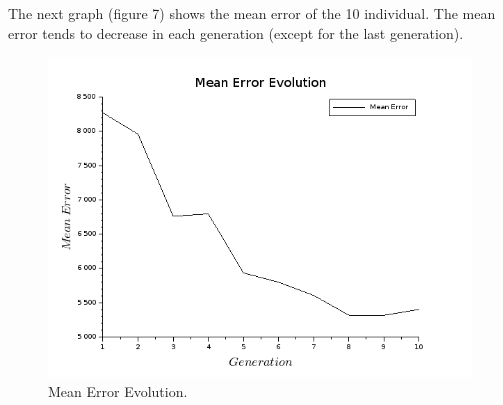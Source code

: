 \documentclass{sig-alternate-05-2015}
\begin{document}
The next graph (figure 7) shows the mean error of the 10 individual. The mean error tends to decrease in each generation (except for the last generation).

\begin{figure}[h!]
\centering
\includegraphics [scale=0.32]{me_evolution}
\caption{Mean Error Evolution.}
\end{figure}


\end{document}
